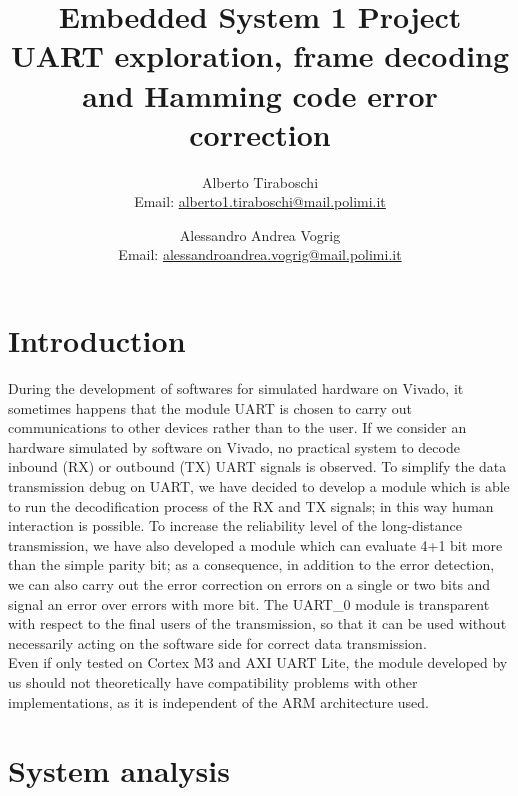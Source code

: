\documentclass[11pt]{article}
\begin{document}
	\title{Embedded System 1 Project \\
		\large UART exploration, frame decoding \\and Hamming code error correction}
	
	\author{Alberto Tiraboschi \\ Email: \href{mailto:alberto1.tiraboschi@mail.polimi.it}{alberto1.tiraboschi@mail.polimi.it} \and Alessandro Andrea Vogrig \\ Email: \href{mailto:alessandroandrea.vogrig@mail.polimi.it}{alessandroandrea.vogrig@mail.polimi.it}}
	\date{}
	\maketitle
	\thispagestyle{empty}
	\clearpage
	\tableofcontents
	\thispagestyle{empty}
	\cleardoublepage	

	\section{Introduction}
	During the development of softwares for simulated hardware on Vivado, it sometimes happens that the module UART is chosen to carry out communications to other devices rather than to the user. If we consider an hardware simulated by software on Vivado, no practical system to decode inbound (RX) or outbound (TX) UART signals is observed. To simplify the data transmission debug on UART, we have decided to develop a module which is able to run the decodification process of the RX and TX signals; in this way human interaction is possible. To increase the reliability level of the long-distance transmission, we have also developed a module which can evaluate 4+1 bit more than the simple parity bit; as a consequence, in addition to the error detection, we can also carry out the error correction on errors on a single or two bits and signal an error over errors with more bit. The UART\_0 module is transparent with respect to the final users of the transmission, so that it can be used without necessarily acting on the software side for correct data transmission. \\
	Even if only tested on Cortex M3 and AXI UART Lite, the module developed by us should not theoretically have compatibility problems with other implementations, as it is independent of the ARM architecture used.
	
	\section{System analysis}
\end{document}
